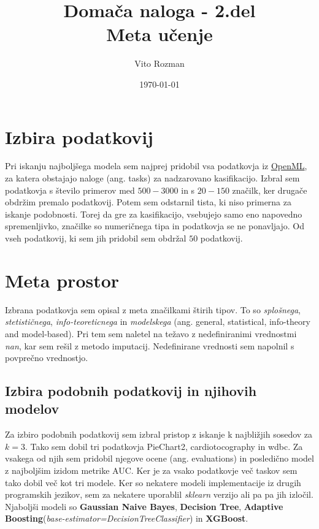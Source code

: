 \documentclass[12pt]{article}
\title{Domača naloga - 2.del \\
\large Meta učenje}
\begin{document}
    
\author{Vito Rozman}
\date{\today}
\maketitle



\section{Izbira podatkovij}

Pri iskanju najboljšega modela sem najprej pridobil vsa podatkovja iz 
\href{https://www.openml.org/}{OpenML}, za katera obstajajo naloge 
(ang. tasks) za nadzarovano kasifikacijo. Izbral sem podatkovja s število 
primerov med $500-3000$ in s $20-150$ značilk, ker drugače obdržim premalo podatkovij. 
Potem sem odstarnil tista, ki
niso primerna za iskanje podobnosti. Torej da gre za kasifikacijo, vsebujejo samo eno
napovedno spremenljivko, značilke so numeričnega tipa in podatkovja se ne ponavljajo.
Od vseh podatkovij, ki sem jih pridobil sem obdržal $50$ podatkovij.


\section{Meta prostor}

Izbrana podatkovja sem opisal z meta značilkami štirih tipov. To so \emph{splošnega},
\emph{stetističnega}, \emph{info-teoreticnega} in \emph{modelskega} 
(ang. general, statistical, info-theory and model-based). Pri tem sem naletel
na težavo z nedefiniranimi vrednostmi \emph{nan}, kar sem rešil z metodo imputacij. 
Nedefinirane vrednosti sem napolnil s povprečno vrednostjo.

\subsection{Izbira podobnih podatkovij in njihovih modelov}

Za izbiro podobnih podatkovij sem izbral pristop z iskanje k najbližjih sosedov za $k=3$.
Tako sem dobil tri podatkovja PieChart2, cardiotocography in  wdbc. Za vsakega od njih
sem pridobil njegove ocene (ang. evaluations) in posledično model z najboljšim izidom metrike AUC. 
Ker je za vsako podatkovje več taskov sem tako dobil več kot tri modele. 
Ker so nekatere  modeli implementacije iz drugih programskih jezikov, sem 
za nekatere uporablil \emph{sklearn} verzijo ali pa pa jih izločil.
Njaboljši modeli so \textbf{Gaussian Naive Bayes}, \textbf{Decision Tree},
\textbf{Adaptive Boosting}(\emph{base-estimator=DecisionTreeClassifier}) in \textbf{XGBoost}.
\end{document}
